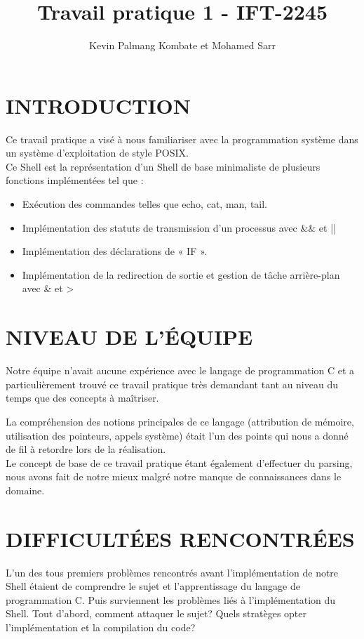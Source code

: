 \documentclass[12pt]{article}
\title{Travail pratique 1 - IFT-2245}
\author{Kevin Palmang Kombate et Mohamed Sarr}
\begin{document}
\maketitle
\newpage

\section{INTRODUCTION}\vspace{0,5cm}

 Ce travail pratique a visé à nous familiariser avec la programmation système dans un système d’exploitation de style POSIX.\\
 
Ce Shell est la représentation d’un Shell de base minimaliste de plusieurs fonctions implémentées tel que :
\begin{itemize}
\item  Exécution des commandes telles que echo, cat, man, tail.
\item Implémentation des statuts de transmission d’un processus avec \&\& et ||  
\item Implémentation des déclarations de « IF ».
\item Implémentation de la redirection de sortie et gestion de tâche arrière-plan avec \& et >
\end{itemize}
\vspace{0,3cm}

\section{NIVEAU DE L'ÉQUIPE}\vspace{0,5cm}

Notre équipe n’avait aucune expérience avec le langage de programmation C et a particulièrement trouvé ce travail pratique très demandant tant au niveau du temps que des concepts à maîtriser. 

La compréhension des notions principales de ce langage (attribution de mémoire, utilisation des pointeurs, appels système) était l’un des points qui nous a donné de fil à retordre lors de la réalisation.\\

Le concept de base de ce travail pratique étant également d’effectuer du parsing, nous avons fait de notre mieux malgré notre manque de connaissances dans le domaine.\vspace{0,3cm}


\section{DIFFICULTÉES RENCONTRÉES}\vspace{0,5cm}
L’un des tous premiers problèmes rencontrés avant l’implémentation de notre Shell étaient de comprendre le sujet et l’apprentissage du langage de programmation C.
Puis surviennent les problèmes liés à l’implémentation du Shell. Tout d’abord, comment attaquer le sujet? Quels stratèges opter l’implémentation et la compilation du code?
\end{document}
